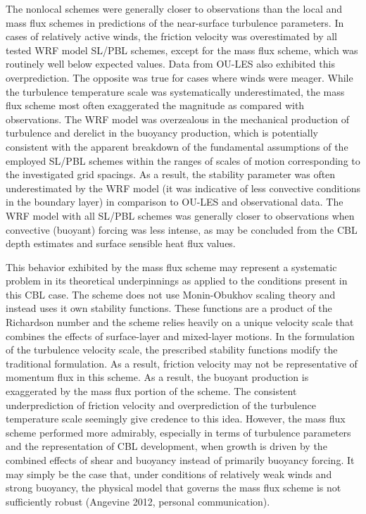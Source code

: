 The nonlocal schemes were generally closer to observations than the local and mass flux schemes in predictions of the near-surface turbulence parameters. In cases of relatively active winds, the friction velocity was overestimated by all tested WRF model SL\slash PBL schemes, except for the mass flux scheme, which was routinely well below expected values. Data from OU-LES also exhibited this overprediction. The opposite was true for cases where winds were meager. While the turbulence temperature scale was systematically underestimated, the mass flux scheme most often exaggerated the magnitude as compared with observations. The WRF model was overzealous in the mechanical production of turbulence and derelict in the buoyancy production, which is potentially consistent with the apparent breakdown of the fundamental assumptions of the employed SL\slash PBL schemes within the ranges of scales of motion corresponding to the investigated grid spacings. As a result, the stability parameter was often underestimated by the WRF model (it was indicative of less convective conditions in the boundary layer) in comparison to OU-LES and observational data. The WRF model with all SL\slash PBL schemes was generally closer to observations when convective (buoyant) forcing was less intense, as may be concluded from the CBL depth estimates and surface sensible heat flux values. 

This behavior exhibited by the mass flux scheme may represent a systematic problem in its theoretical underpinnings as applied to the conditions present in this CBL case. The scheme does not use Monin-Obukhov scaling theory and instead uses it own stability functions. These functions are a product of the Richardson number and the scheme relies heavily on a unique velocity scale that combines the effects of surface-layer and mixed-layer motions. In the formulation of the turbulence velocity scale, the prescribed stability functions modify the traditional formulation. As a result, friction velocity may not be representative of momentum flux in this scheme. As a result, the buoyant production is exaggerated by the mass flux portion of the scheme. The consistent underprediction of friction velocity and overprediction of the turbulence temperature scale seemingly give credence to this idea. However, the mass flux scheme performed more admirably, especially in terms of turbulence parameters and the representation of CBL development, when growth is driven by the combined effects of shear and buoyancy instead of primarily buoyancy forcing. It may simply be the case that, under conditions of relatively weak winds and strong buoyancy, the physical model that governs the mass flux scheme is not sufficiently robust (Angevine 2012, personal communication). 

